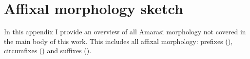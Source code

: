 \chapter{Affixal morphology sketch}\label{ch:MorphSketch}
In this appendix I provide an overview of all Amarasi morphology
not covered in the main body of this work.
This includes all affixal morphology: prefixes (),
circumfixes () and suffixes ().





